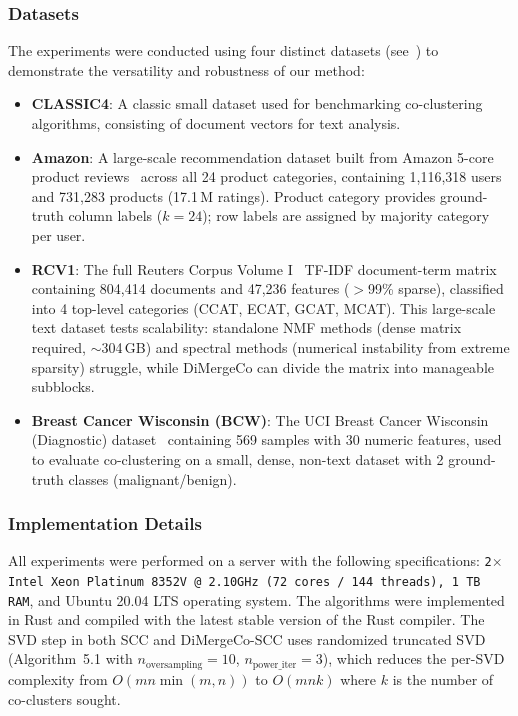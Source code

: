 \documentclass[journal]{IEEEtran}
\theoremstyle{definition}
\theoremstyle{remark} %
\renewcommand{\cite}[1]{~\autocite{#1}}
\begin{document}
\subsubsection{Datasets}
\label{subsec:datasets}
The experiments were conducted using four distinct datasets (see~) to demonstrate the versatility and robustness of our method:
\begin{itemize}
    \item \textbf{CLASSIC4}: A classic small dataset used for benchmarking co-clustering algorithms, consisting of document vectors for text analysis.
    \item \textbf{Amazon}: {\color{blue}A large-scale recommendation dataset built from Amazon 5-core product reviews\cite{ni2019JustifyingRecommendationsUsing} across all 24 product categories, containing 1,116,318 users and 731,283 products (17.1\,M ratings). Product category provides ground-truth column labels ($k{=}24$); row labels are assigned by majority category per user.}
    \item \textbf{RCV1}: {\color{blue}The full Reuters Corpus Volume I\cite{lewis2004RCV1NewBenchmark} TF-IDF document-term matrix containing 804,414 documents and 47,236 features ($>$99\% sparse), classified into 4 top-level categories (CCAT, ECAT, GCAT, MCAT). This large-scale text dataset tests scalability: standalone NMF methods (dense matrix required, $\sim$304\,GB) and spectral methods (numerical instability from extreme sparsity) struggle, while DiMergeCo can divide the matrix into manageable subblocks.}
    \item \textbf{Breast Cancer Wisconsin (BCW)}: {\color{blue}The UCI Breast Cancer Wisconsin (Diagnostic) dataset\cite{sklearn2011} containing 569 samples with 30 numeric features, used to evaluate co-clustering on a small, dense, non-text dataset with 2 ground-truth classes (malignant/benign).}
\end{itemize}

\subsubsection{Implementation Details}
All experiments were performed on a server with the following specifications: \texttt{2$\times$ Intel Xeon Platinum 8352V @ 2.10GHz (72 cores / 144 threads), 1\,TB RAM}, and Ubuntu 20.04 LTS operating system. The algorithms were implemented in Rust and compiled with the latest stable version of the Rust compiler. {\color{blue}The SVD step in both SCC and DiMergeCo-SCC uses randomized truncated SVD\cite{halko2011FindingStructureRandomness} (Algorithm~5.1 with $n_{\text{oversampling}}=10$, $n_{\text{power\_iter}}=3$), which reduces the per-SVD complexity from $O(mn\min(m,n))$ to $O(mnk)$ where $k$ is the number of co-clusters sought.}
\end{document}
